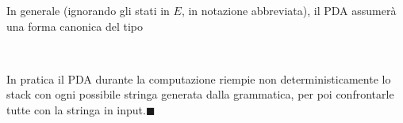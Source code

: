 \documentclass[10pt, letterpaper]{report}
\begin{document}
In generale (ignorando gli stati in $E$, in notazione abbreviata), il PDA assumerà una forma canonica del tipo
\begin{center}
    \\
\end{center}
In pratica il PDA durante la computazione riempie non deterministicamente lo stack con ogni possibile stringa generata dalla grammatica, per poi confrontarle tutte con la stringa in input.\hfill $\blacksquare$
\end{document}
